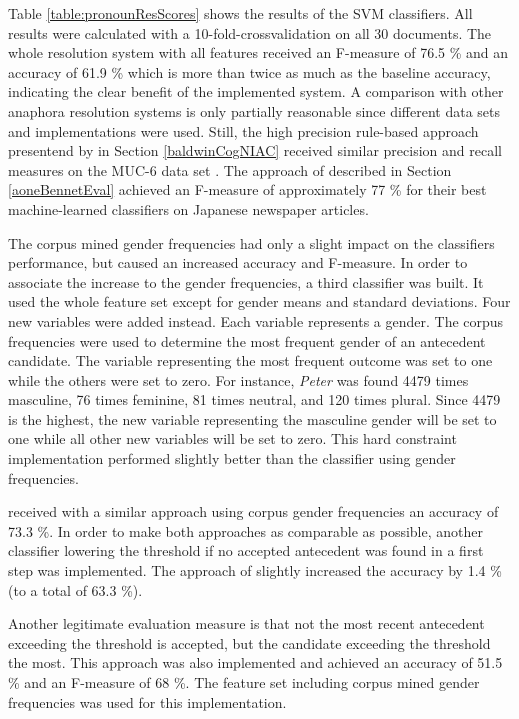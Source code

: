 Table \ref{table:pronounResScores} shows the results of the SVM classifiers. All results were calculated with a 10-fold-crossvalidation on all 30 documents. The whole resolution system with all features received an F-measure of 76.5 \% and an accuracy of 61.9 \% which is more than twice as much as the baseline accuracy, indicating the clear benefit of the implemented system. A comparison with other anaphora resolution systems is only partially reasonable since different data sets and implementations were used. Still, the high precision rule-based approach presentend by \cite{baldwin1997cogniac} in Section \ref{baldwinCogNIAC} received similar precision and recall measures on the MUC-6 data set \citep{grishman1996message}. The approach of \cite{aone1995evaluating} described in Section \ref{aoneBennetEval} achieved an F-measure of approximately 77 \% for their best machine-learned classifiers on Japanese newspaper articles.

The corpus mined gender frequencies had only a slight impact on the classifiers performance, but caused an increased accuracy and F-measure. In order to associate the increase to the gender frequencies, a third classifier was built. It used the whole feature set except for gender means and standard deviations. Four new variables were added instead. Each variable represents a gender. The corpus frequencies were used to determine the most frequent gender of an antecedent candidate. The variable representing the most frequent outcome was set to one while the others were set to zero. For instance, \textit{Peter} was found 4479 times masculine, 76 times feminine, 81 times neutral, and 120 times plural. Since 4479 is the highest, the new variable representing the masculine gender will be set to one while all other new variables will be set to zero. This hard constraint implementation performed slightly better than the classifier using gender frequencies.

\cite{bergsma2005automatic} received with a similar approach using corpus gender frequencies an accuracy of 73.3 \%. In order to make both approaches as comparable as possible, another classifier lowering the threshold if no accepted antecedent was found in a first step was implemented. The approach of \cite{bergsma2005automatic} slightly increased the accuracy by 1.4 \% (to a total of 63.3 \%). 

Another legitimate evaluation measure is that not the most recent antecedent exceeding the threshold is accepted, but the candidate exceeding the threshold the most. This approach was also implemented and achieved an accuracy of 51.5 \% and an F-measure of 68 \%. The feature set including corpus mined gender frequencies was used for this implementation.

